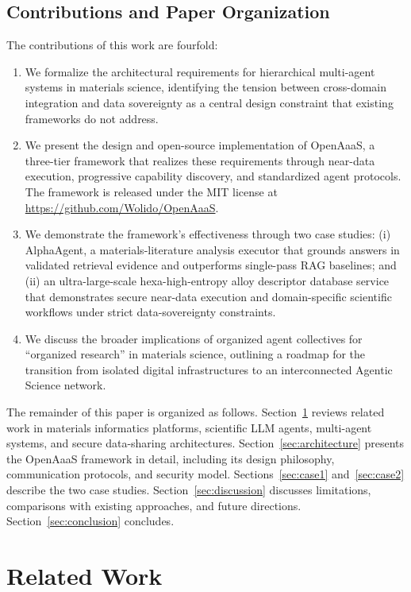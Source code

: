 \documentclass{article}
\begin{document}
\subsection{Contributions and Paper Organization}

The contributions of this work are fourfold:
\begin{enumerate}
\item We formalize the architectural requirements for hierarchical multi-agent systems in materials science, identifying the tension between cross-domain integration and data sovereignty as a central design constraint that existing frameworks do not address.
\item We present the design and open-source implementation of OpenAaaS, a three-tier framework that realizes these requirements through near-data execution, progressive capability discovery, and standardized agent protocols. The framework is released under the MIT license at \url{https://github.com/Wolido/OpenAaaS}.
\item We demonstrate the framework's effectiveness through two case studies: (i) AlphaAgent, a materials-literature analysis executor that grounds answers in validated retrieval evidence and outperforms single-pass RAG baselines; and (ii) an ultra-large-scale hexa-high-entropy alloy descriptor database service that demonstrates secure near-data execution and domain-specific scientific workflows under strict data-sovereignty constraints.
\item We discuss the broader implications of organized agent collectives for ``organized research'' in materials science, outlining a roadmap for the transition from isolated digital infrastructures to an interconnected Agentic Science network.
\end{enumerate}

The remainder of this paper is organized as follows. Section~\ref{sec:related} reviews related work in materials informatics platforms, scientific LLM agents, multi-agent systems, and secure data-sharing architectures. Section~\ref{sec:architecture} presents the OpenAaaS framework in detail, including its design philosophy, communication protocols, and security model. Sections~\ref{sec:case1} and~\ref{sec:case2} describe the two case studies. Section~\ref{sec:discussion} discusses limitations, comparisons with existing approaches, and future directions. Section~\ref{sec:conclusion} concludes.


\section{Related Work}
\label{sec:related}
\end{document}
